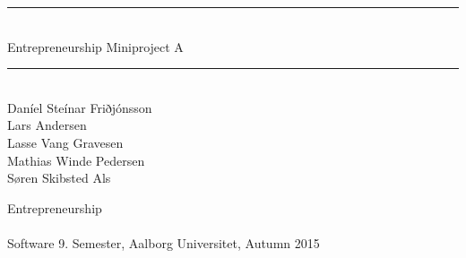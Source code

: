%
%
%
%
% 



\begin{titlepage}
\begin{center}
\newcommand{\HRule}{\rule{\linewidth}{0.5mm}}
\HRule \\[0.4cm]
\Huge Entrepreneurship Miniproject A \\[0.3cm]

\HRule \\[1cm]
\noindent
  {\small
  Daníel Steínar Friðjónsson\\
  Lars Andersen\\
  Lasse Vang Gravesen\\
  Mathias Winde Pedersen\\
  Søren Skibsted Als\\}

\vfill
{\Large Entrepreneurship}
\\ ~\\
{\large Software 9. Semester, Aalborg Universitet, Autumn 2015}

\end{center}
\end{titlepage}

\pagestyle{empty} %
%

\pagestyle{fancy} %
\setcounter{tocdepth}{1}
%




\newpage


\label{bib:mybiblio}

\appendix
%


